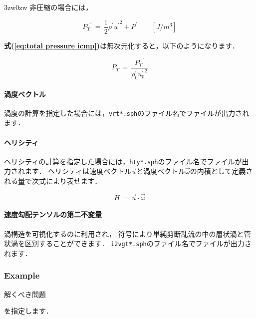 \begin{indentation}{3zw}{0zw}
非圧縮の場合には，

\begin{equation}
{P_{T}}^{\prime} \,=\, \frac{1}{2} \rho^{\prime} {u^{\prime}}^{2} + P^{\prime} \qquad [J/m^3]
\label{eq:total pressure icmp}
\end{equation}

\textbf{式(\ref{eq:total pressure icmp})}は無次元化すると，以下のようになります．

\begin{equation}
P_{T} \,=\, \frac{{P_{T}}^{\prime}}{\rho_{\mathit{0}}^{\prime} {u_{\mathit{0}}^{\prime}}^{2}}
\label{eq:total pressure icmp ND}
\end{equation}

%
\paragraph{渦度ベクトル}
渦度の計算を指定した場合には，\verb|vrt*.sph|のファイル名でファイルが出力されます．

%
\paragraph{ヘリシティ}
ヘリシティの計算を指定した場合には，\verb|hty*.sph|のファイル名でファイルが出力されます．
ヘリシティは速度ベクトル$\overrightarrow{u}$と渦度ベクトル$\overrightarrow{\omega}$の内積として定義される量で次式により表せます．

\begin{equation}
H \,=\, \overrightarrow{u} \cdot \overrightarrow{\omega}
\label{eq:helicity}
\end{equation}


%
\paragraph{速度勾配テンソルの第二不変量}
渦構造を可視化するのに利用され，
符号により単純剪断乱流の中の層状渦と管状渦を区別することができます\cite{tanaka:93:PF}．
\verb|i2vgt*.sph|のファイル名でファイルが出力されます．

\end{indentation}



\pagebreak
\subsubsection{Example}

\hypertarget{tgt:example}{解くべき問題}を指定します．

